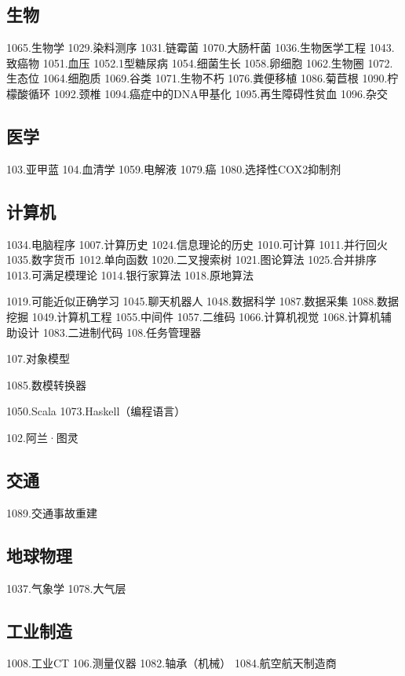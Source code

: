 \subsection{生物}
1065.生物学
1029.染料测序
1031.链霉菌
1070.大肠杆菌
1036.生物医学工程
1043.致癌物
1051.血压
1052.1型糖尿病
1054.细菌生长
1058.卵细胞
1062.生物圈
1072.生态位
1064.细胞质
1069.谷类
1071.生物不朽
1076.粪便移植
1086.菊苣根
1090.柠檬酸循环
1092.颈椎
1094.癌症中的DNA甲基化
1095.再生障碍性贫血
1096.杂交

\subsection{医学}
103.亚甲蓝
104.血清学
1059.电解液
1079.癌
1080.选择性COX2抑制剂

\subsection{计算机}
1034.电脑程序
1007.计算历史
1024.信息理论的历史
1010.可计算
1011.并行回火
1035.数字货币
1012.单向函数
1020.二叉搜索树
1021.图论算法
1025.合并排序
1013.可满足模理论
1014.银行家算法
1018.原地算法

1019.可能近似正确学习
1045.聊天机器人
1048.数据科学
1087.数据采集
1088.数据挖掘
1049.计算机工程
1055.中间件
1057.二维码
1066.计算机视觉
1068.计算机辅助设计
1083.二进制代码
108.任务管理器

107.对象模型

1085.数模转换器

1050.Scala
1073.Haskell（编程语言）

102.阿兰·图灵


\subsection{交通}
1089.交通事故重建

\subsection{地球物理}
1037.气象学
1078.大气层

\subsection{工业制造}
1008.工业CT
106.测量仪器
1082.轴承（机械）
1084.航空航天制造商
